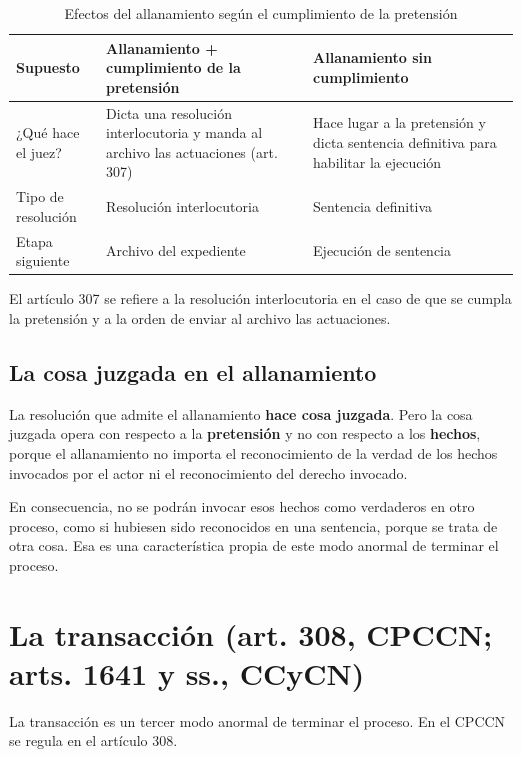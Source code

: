 \documentclass[12pt,oneside]{book}
\begin{document}
\begin{table}[H]
\centering
\caption{Efectos del allanamiento según el cumplimiento de la pretensión}
\small
\begin{tabularx}{\textwidth}{
    >{\raggedright\arraybackslash}p{}
    >{\raggedright\arraybackslash}X
    >{\raggedright\arraybackslash}X
}
\toprule
\textbf{Supuesto} & \textbf{Allanamiento + cumplimiento de la pretensión} & \textbf{Allanamiento sin cumplimiento} \\
\midrule
¿Qué hace el juez? & Dicta una resolución interlocutoria y manda al archivo las actuaciones (art. 307) & Hace lugar a la pretensión y dicta sentencia definitiva para habilitar la ejecución \\
Tipo de resolución & Resolución interlocutoria & Sentencia definitiva \\
Etapa siguiente & Archivo del expediente & Ejecución de sentencia \\
\bottomrule
\end{tabularx}
\end{table}

El artículo 307 se refiere a la resolución interlocutoria en el caso de que se cumpla la pretensión y a la orden de enviar al archivo las actuaciones.

\subsection{La cosa juzgada en el allanamiento}

La resolución que admite el allanamiento \textbf{hace cosa juzgada}. Pero la cosa juzgada opera con respecto a la \textbf{pretensión} y no con respecto a los \textbf{hechos}, porque el allanamiento no importa el reconocimiento de la verdad de los hechos invocados por el actor ni el reconocimiento del derecho invocado.

En consecuencia, no se podrán invocar esos hechos como verdaderos en otro proceso, como si hubiesen sido reconocidos en una sentencia, porque se trata de otra cosa. Esa es una característica propia de este modo anormal de terminar el proceso.

\section{La transacción (art. 308, CPCCN; arts. 1641 y ss., CCyCN)}

La transacción es un tercer modo anormal de terminar el proceso. En el CPCCN se regula en el artículo 308.
\end{document}
